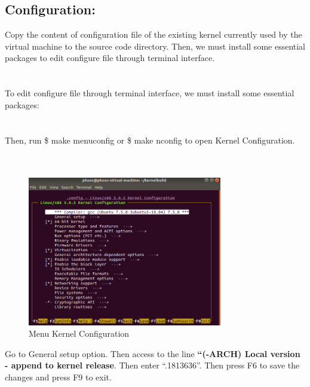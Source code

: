 \documentclass[a4paper]{article}
\begin{document}
\subsection{Configuration:}
Copy the content of configuration file of the existing kernel currently used by the virtual machine to the source code directory. Then, we must install some essential packages to edit configure file through terminal interface.\\
\noindent{}\\
\\
To edit configure file through terminal interface, we must install some essential packages:\\
\noindent{}\\
\\
Then, run \$ make menuconfig or \$ make nconfig to open Kernel Configuration.\\
\noindent{}\\
\\
\begin{figure}[h!]
\begin{center}
\includegraphics[width=8.5cm]{1.png}
\caption{Menu Kernel Configuration}
\end{center}
\end{figure}
Go to General setup option. Then access to the line \textbf{``(-ARCH) Local version - append to kernel release}. Then enter ``.1813636''.  Then press F6 to save the changes and press F9 to exit.\\
\end{document}
